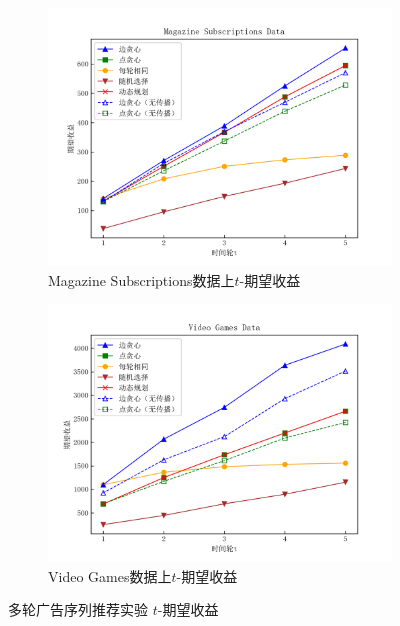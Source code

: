 \begin{figure}[th]
    \begin{subfigure}{0.45\textwidth}
       \includegraphics[width=\linewidth]{figure/sasim/nonadp/non_cn_magazine}
        \caption{Magazine Subscriptions数据上$t$-期望收益}
        \label{fig:non3}
    \end{subfigure}
    \hfill
    \begin{subfigure}{0.45\textwidth}
        \includegraphics[width=\linewidth]{figure/sasim/nonadp/non_cn_video}
        \caption{Video Games数据上$t$-期望收益}
        \label{fig:non4}
    \end{subfigure}
    \caption{多轮广告序列推荐实验 $t$-期望收益}
    \label{fig:non}
\end{figure}

